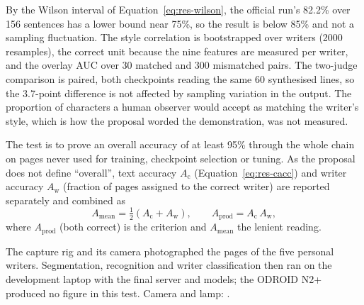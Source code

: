 
            By the Wilson interval of Equation~\ref{eq:res-wilson}, the official run's 82.2\% over 156 sentences has a lower bound near 75\%, so the result is below 85\% and not a sampling fluctuation.
            The style correlation is bootstrapped over writers (2000 resamples), the correct unit because the nine features are measured per writer, and the overlay AUC over 30 matched and 300 mismatched pairs.
            The two-judge comparison is paired, both checkpoints reading the same 60 synthesised lines, so the 3.7-point difference is not affected by sampling variation in the output.
            The proportion of characters a human observer would accept as matching the writer's style, which is how the proposal worded the demonstration, was not measured.


\medskip
\label{sec:res-qtp2}


            The test is to prove an overall accuracy of at least 95\% through the whole chain on pages never used for training, checkpoint selection or tuning.
            As the proposal does not define ``overall'', text accuracy $A_{\mathrm{c}}$ (Equation~\ref{eq:res-cacc}) and writer accuracy $A_{\mathrm{w}}$ (fraction of pages assigned to the correct writer) are reported separately and combined as
            \begin{equation}
            \label{eq:res-overall}
            A_{\mathrm{mean}}=\tfrac{1}{2}\left(A_{\mathrm{c}}+A_{\mathrm{w}}\right),\qquad A_{\mathrm{prod}}=A_{\mathrm{c}}\,A_{\mathrm{w}},
            \end{equation}
            where $A_{\mathrm{prod}}$ (both correct) is the criterion and $A_{\mathrm{mean}}$ the lenient reading.


            The capture rig and its camera photographed the pages of the five personal writers. Segmentation, recognition and writer classification then ran on the development laptop with the final server and models; the ODROID N2+ produced no figure in this test. Camera and lamp: .

